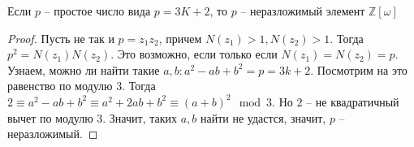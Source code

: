 \documentclass{article}
\begin{document}
\begin{statement}
    Если $p$ -- простое число вида $p = 3K+2$, то $p$ -- неразложимый элемент $\mathbb{Z}[\omega]$
\end{statement}

\begin{proof}
    Пусть не так и $p = z_1 z_2$, причем $N(z_1) > 1, N(z_2) > 1$. Тогда $p^2 = N(z_1) N(z_2)$. Это возможно, если
    только если $N(z_1) = N(z_2) = p$. Узнаем, можно ли найти такие $a, b: a^2 - ab + b^2 = p = 3k+2$. Посмотрим на это
    равенство по модулю $3$. Тогда $2 \equiv a^2 - ab + b^2 \equiv a^2 + 2ab + b^2 \equiv (a + b)^2 \mod 3$. Но $2$ --
    не квадратичный вычет по модулю $3$. Значит, таких $a, b$ найти не удастся, значит, $p$ -- неразложимый. 
\end{proof}
\end{document}
